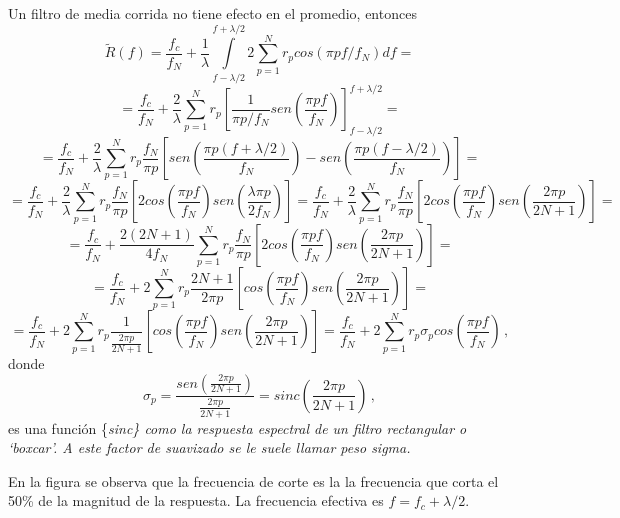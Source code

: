 \documentclass[
]{agujournal2019}
\begin{document}
Un filtro de media corrida no tiene efecto en el promedio, entonces
\[\widetilde{R}(f)=\frac{f_c}{f_N} + \frac{1}{\lambda}
\int\limits^{f+\lambda/2}_{f-\lambda/2} 2 \sum\limits^{N}_{p=1}
r_pcos(\pi p f / f_N)d{f}=\]
\[=\frac{f_c}{f_N} + \frac{2}{\lambda}\sum\limits^{N}_{p=1} r_p
\left[\frac{1}{\pi p /f_N} sen\left( \frac{\pi p
f}{f_N}\right)\right]^{f+\lambda/2}_{f-\lambda/2}=\]
\[=\frac{f_c}{f_N}+ \frac{2}{\lambda}\sum\limits^{N}_{p=1}
r_p\frac{f_N}{\pi p}\left[sen\left( \frac{\pi p
(f+\lambda/2)}{f_N}\right)-sen\left( \frac{\pi p
(f-\lambda/2)}{f_N}\right) \right]=\]
\[=\frac{f_c}{f_N}+ \frac{2}{\lambda}\sum\limits^{N}_{p=1}
r_p\frac{f_N}{\pi p}\left[2cos\left( \frac{\pi p
f}{f_N}\right)sen\left( \frac{\lambda \pi p}{2f_N}\right) \right]=
\frac{f_c}{f_N}+ \frac{2}{\lambda}\sum\limits^{N}_{p=1}
r_p\frac{f_N}{\pi p}\left[2cos\left( \frac{\pi p
f}{f_N}\right)sen\left( \frac{2 \pi p}{2N+1}\right) \right]=\] \[=
\frac{f_c}{f_N}+ \frac{2(2N+1)}{4f_N}\sum\limits^{N}_{p=1}
r_p\frac{f_N}{\pi p}\left[2cos\left( \frac{\pi p
f}{f_N}\right)sen\left( \frac{2 \pi p}{2N+1}\right) \right]=\] \[=
\frac{f_c}{f_N}+ 2\sum\limits^{N}_{p=1}
r_p\frac{2N+1}{2 \pi p}\left[cos\left( \frac{\pi p
f}{f_N}\right)sen\left( \frac{2 \pi p}{2N+1}\right) \right]=\] \[=
\frac{f_c}{f_N}+ 2\sum\limits^{N}_{p=1}
r_p\frac{1}{\frac{2 \pi p}{2N+1}}\left[cos\left( \frac{\pi p
f}{f_N}\right)sen\left( \frac{2 \pi p}{2N+1}\right) \right]=
\frac{f_c}{f_N}+ 2\sum\limits^{N}_{p=1}
r_p \sigma_p cos\left( \frac{\pi p
f}{f_N}\right)\,,\] donde
\[\sigma_p=\frac{sen\left( \frac{2 \pi p}{2N+1}\right)}{\frac{2 \pi p}{2N+1}}=
sinc\left(\frac{2 \pi p}{2N+1} \right)\,,\] es una función \{\it sinc\}
como la respuesta espectral de un filtro rectangular o `boxcar'. A este
factor de suavizado se le suele llamar peso sigma.

\begin{center}
\end{center}

En la figura se observa que la frecuencia de corte es la la frecuencia
que corta el 50\% de la magnitud de la respuesta. La frecuencia efectiva
es \(f=f_c+\lambda/2\).
\end{document}
